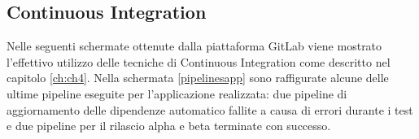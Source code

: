 \begin{multicols}{3}

\end{multicols}

\subsection{Continuous Integration}
Nelle seguenti schermate ottenute dalla piattaforma GitLab viene mostrato l'effettivo utilizzo delle tecniche di Continuous Integration come descritto nel capitolo \ref{ch:ch4}. Nella schermata \ref{pipelinesapp} sono raffigurate alcune delle ultime pipeline eseguite per l'applicazione realizzata: due pipeline di aggiornamento delle dipendenze automatico fallite a causa di errori durante i test e due pipeline per il rilascio alpha e beta terminate con successo.

